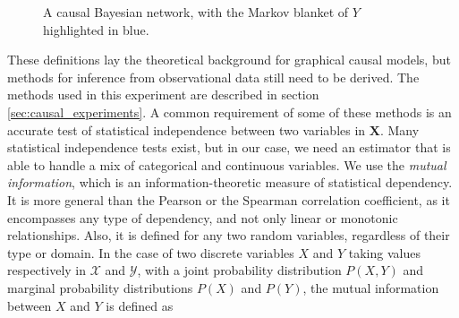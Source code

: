 \begin{figure}
    \centering
    \caption{A causal Bayesian network, with the Markov blanket of $Y$
    highlighted in blue.}
    \label{fig:markov_blanket}
\end{figure}

These definitions lay the theoretical background for graphical causal models,
but methods for inference from observational data still need to be derived. The
methods used in this experiment are described in section
\ref{sec:causal_experiments}. A common requirement of some of these methods is
an accurate test of statistical independence between two variables in $\bm X$.
Many statistical independence tests exist, but in our case, we need an estimator
that is able to handle a mix of categorical and continuous variables. We use the
\emph{mutual information}, which is an information-theoretic measure of
statistical dependency. It is more general than the Pearson or the Spearman
correlation coefficient, as it encompasses any type of dependency, and not only
linear or monotonic relationships. Also, it is defined for any two random
variables, regardless of their type or domain. In the case of two discrete
variables $X$ and $Y$ taking values respectively in $\mathcal X$ and $\mathcal
Y$, with a joint probability distribution $P(X, Y)$ and marginal probability
distributions $P(X)$ and $P(Y)$, the mutual information between $X$ and  $Y$ is
defined as \parencite{cover2012elements}

